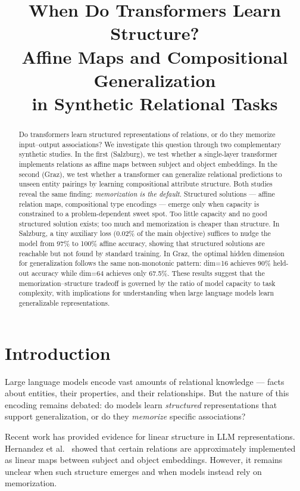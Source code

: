 \documentclass[11pt]{article}
\title{When Do Transformers Learn Structure?\\Affine Maps and Compositional Generalization\\in Synthetic Relational Tasks}
\date{}
\begin{document}
\maketitle

\begin{abstract}
Do transformers learn structured representations of relations, or do they memorize
input--output associations? We investigate this question through two complementary
synthetic studies. In the first (Salzburg), we test whether a single-layer transformer
implements relations as affine maps between subject and object embeddings. In the
second (Graz), we test whether a transformer can generalize relational predictions to
unseen entity pairings by learning compositional attribute structure. Both studies
reveal the same finding: \emph{memorization is the default}. Structured solutions ---
affine relation maps, compositional type encodings --- emerge only when capacity is
constrained to a problem-dependent sweet spot. Too little capacity and no good
structured solution exists; too much and memorization is cheaper than structure. In
Salzburg, a tiny auxiliary loss (0.02\% of the main objective) suffices to nudge the
model from 97\% to 100\% affine accuracy, showing that structured solutions are
reachable but not found by standard training. In Graz, the optimal hidden dimension
for generalization follows the same non-monotonic pattern: dim=16 achieves 90\%
held-out accuracy while dim=64 achieves only 67.5\%. These results suggest that the
memorization--structure tradeoff is governed by the ratio of model capacity to task
complexity, with implications for understanding when large language models learn
generalizable representations.
\end{abstract}

\section{Introduction}

Large language models encode vast amounts of relational knowledge --- facts about
entities, their properties, and their relationships. But the nature of this encoding
remains debated: do models learn \emph{structured} representations that support
generalization, or do they \emph{memorize} specific associations?

Recent work has provided evidence for linear structure in LLM representations.
Hernandez et al.~\cite{hernandez2024} showed that certain relations are approximately
implemented as linear maps between subject and object embeddings. However, it remains
unclear when such structure emerges and when models instead rely on memorization.
\end{document}
